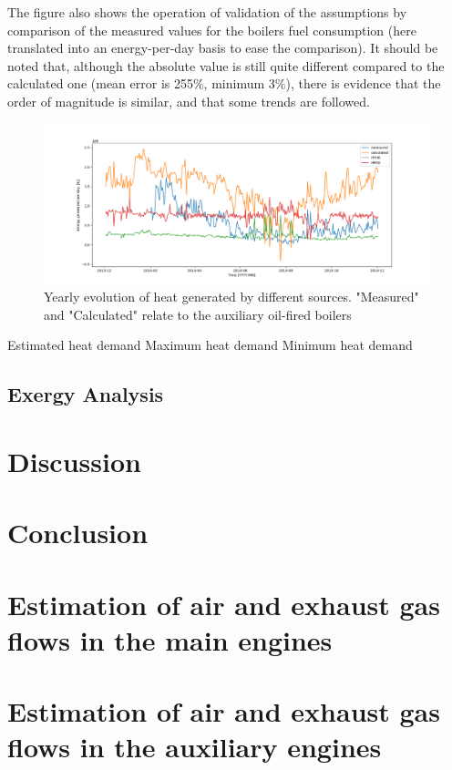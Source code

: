 \documentclass[preprint,12pt]{elsarticle}
\begin{document}
The figure also shows the operation of validation of the assumptions by comparison of the measured values for the boilers fuel consumption (here translated into an energy-per-day basis to ease the comparison). It should be noted that, although the absolute value is still quite different compared to the calculated one (mean error is 255\%, minimum 3\%), there is evidence that the order of magnitude is similar, and that some trends are followed.

\begin{figure}
	\centering
	\includegraphics[width=0.99\linewidth]{Figures/Heat_vs_time}
	\caption{Yearly evolution of heat generated by different sources. "Measured" and "Calculated" relate to the auxiliary oil-fired boilers}
	\label{fig:Heat_vs_time}
\end{figure}

Estimated heat demand
Maximum heat demand 
Minimum heat demand

\subsection{Exergy Analysis} \label{sec:res:exergy}





\section{Discussion}
\label{sec:discussion}


\section{Conclusion}
\label{sec:conclusion}

\appendix

\section{Estimation of air and exhaust gas flows in the main engines}

\section{Estimation of air and exhaust gas flows in the auxiliary engines}




\end{document}
